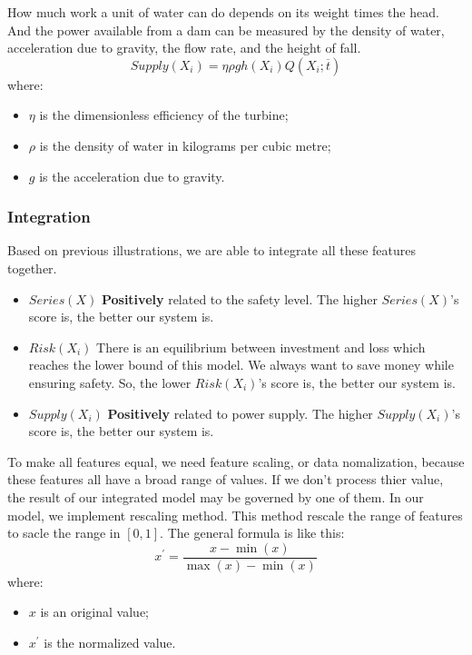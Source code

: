 \documentclass{mcmthesis}
\begin{document}
How much work a unit of water can do depends on its weight times the head. And the power available from a dam can be measured by the density of water, acceleration due to gravity, the flow rate, and the height of fall.
\begin{equation}
\label{eq:Supply}
Supply(X_i) =\eta \rho g h(X_i)Q(X_i;\overline{t})
\end{equation}
where:
\begin{itemize}
	\item $\eta$ is the dimensionless efficiency of the turbine;
	\item $\rho$ is the density of water in kilograms per cubic metre;
	\item $g$ is the acceleration due to gravity.
\end{itemize}
\subsubsection{Integration}\label{Sec:Integration}
Based on previous illustrations, we are able to integrate all these features together.
\begin{itemize}
\item $Series(X)$ \textbf{Positively} related to the safety level. The higher  $Series(X)$'s score is, the better our system is.
\item $Risk(X_i)$ There is an equilibrium between investment and loss which reaches the lower bound of this model. We always want to save money while ensuring safety. So, the lower $Risk(X_i)$'s score is, the better our system is.
\item $Supply(X_i)$ \textbf{Positively} related to power supply. The higher  $Supply(X_i)$'s score is, the better our system is.
\end{itemize}

To make all features equal, we need feature scaling, or data nomalization, because these features all have a broad range of values. If we don't process thier value, the result of our integrated model may be governed by one of them. In our model, we implement rescaling method. This method rescale the range of features to sacle the range in $[0, 1]$. The general formula is like this:
\begin{equation*}
x^{'}=\frac{x-\min(x)}{\max(x)-\min(x)}
\end{equation*}
where:
\begin{itemize}
\item $x$ is an original value;
\item $x^{'}$ is the normalized value.
\end{itemize}
\end{document}
